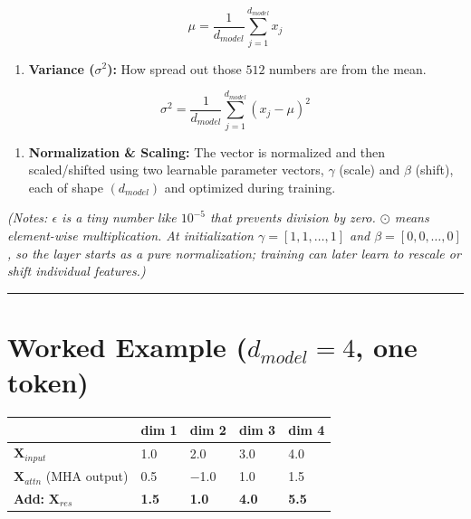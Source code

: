 \documentclass[11pt,a4paper,oneside]{report}
\providecommand{\tightlist}{\setlength{\itemsep}{0pt}\setlength{\parskip}{0pt}}
\begin{document}
\[\mu = \frac{1}{d_{model}} \sum_{j=1}^{d_{model}} x_j\]

\begin{enumerate}
\def\labelenumi{\arabic{enumi}.}
\setcounter{enumi}{1}
\tightlist
\item
  \textbf{Variance (\(\sigma^2\)):} How spread out those \(512\) numbers are from the mean.
\end{enumerate}

\[\sigma^2 = \frac{1}{d_{model}} \sum_{j=1}^{d_{model}} (x_j - \mu)^2\]

\begin{enumerate}
\def\labelenumi{\arabic{enumi}.}
\setcounter{enumi}{2}
\tightlist
\item
  \textbf{Normalization \& Scaling:} The vector is normalized and then scaled/shifted using two learnable parameter vectors, \(\gamma\) (scale) and \(\beta\) (shift), each of shape \((d_{model})\) and optimized during training.
\end{enumerate}

\begin{center}\end{center}

\emph{(Notes: \(\epsilon\) is a tiny number like \(10^{-5}\) that prevents division by zero. \(\odot\) means element-wise multiplication. At initialization \(\gamma = [1, 1, \dots, 1]\) and \(\beta = [0, 0, \dots, 0]\), so the layer starts as a pure normalization; training can later learn to rescale or shift individual features.)}

\begin{center}\rule{0.5\linewidth}{0.5pt}\end{center}

\section{\texorpdfstring{Worked Example (\(d_{model} = 4\), one token)}{Worked Example (d\_\{model\} = 4, one token)}}\label{worked-example-d_model--4-one-token}

{\def\LTcaptype{none} %
\begin{longtable}[]{@{}lllll@{}}
\toprule\noalign{}
& dim 1 & dim 2 & dim 3 & dim 4 \\
\midrule\noalign{}
\endhead
\bottomrule\noalign{}
\endlastfoot
\(\mathbf{X}_{input}\) & 1.0 & 2.0 & 3.0 & 4.0 \\
\(\mathbf{X}_{attn}\) (MHA output) & 0.5 & −1.0 & 1.0 & 1.5 \\
\textbf{Add:} \(\mathbf{X}_{res}\) & \textbf{1.5} & \textbf{1.0} & \textbf{4.0} & \textbf{5.5} \\
\end{longtable}
}
\end{document}
